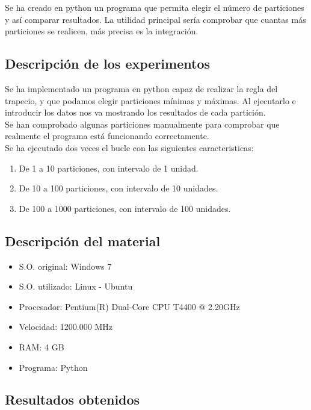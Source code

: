 \documentclass{article}
\begin{document}
   Se ha creado en python un programa que permita elegir el número de particiones y así comparar resultados. La utilidad principal sería comprobar que cuantas más particiones se realicen, más precisa es la integración.
    
    \subsection{Descripción de los experimentos}

   Se ha implementado un programa en python capaz de realizar la regla del trapecio, y que podamos elegir particiones mínimas y máximas. Al ejecutarlo e introducir los datos nos va mostrando los resultados de cada partición.\\

   Se han comprobado algunas particiones manualmente para comprobar que realmente el programa está funcionando correctamente.\\

   Se ha ejecutado dos veces el bucle con las siguientes caracteristicas:
 
   \begin{enumerate}
     \item De 1 a 10 particiones, con intervalo de 1 unidad.
     \item De 10 a 100 particiones, con intervalo de 10 unidades.
     \item De 100 a 1000 particiones, con intervalo de 100 unidades.
   \end{enumerate}

    \subsection{Descripción del material}

      \begin{itemize}
        \item S.O. original: Windows 7
        \item S.O. utilizado: Linux - Ubuntu
        \item Procesador: Pentium(R) Dual-Core CPU  T4400  @ 2.20GHz
        \item Velocidad: 1200.000 MHz
        \item RAM: 4 GB
        \item Programa: Python
      \end{itemize}

    \subsection{Resultados obtenidos}
\end{document}
